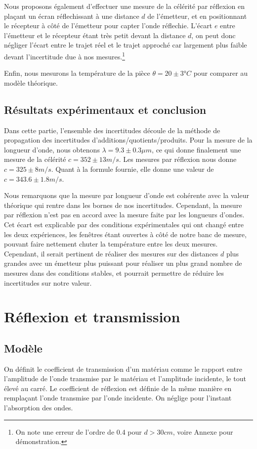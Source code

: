 \documentclass[12pt]{article}
\begin{document}
Nous proposons également d'effectuer une mesure de la célérité par réflexion en plaçant un écran réflechissant à une distance $d$ de l'émetteur, et en positionnant le récepteur à côté de l'émetteur pour capter l'onde réflechie.
L'écart $e$ entre l'émetteur et le récepteur étant très petit devant la distance $d$, on peut donc négliger l'écart entre le trajet réel et le trajet approché car largement plus faible devant l'incertitude due à nos mesures.\footnote{On note une erreur de l'ordre de 0.4 pour $d > 30cm$, voire Annexe pour démonstration.}

Enfin, nous mesurons la température de la pièce $\theta = 20 \pm 3 \text{°} C$ pour comparer au modèle théorique.

\subsection{Résultats expérimentaux et conclusion}
Dans cette partie, l'ensemble des incertitudes découle de la méthode de propagation des incertitudes d'additions/quotients/produits.
Pour la mesure de la longueur d'onde, nous obtenons $\lambda = 9.3 \pm 0.3 \mu m$, ce qui donne finalement une mesure de la célérité $c = 352 \pm 13 m/s$. Les mesures par réflexion nous donne $c = 325 \pm 8 m/s$. 
Quant à la formule fournie, elle donne une valeur de $c = 343.6 \pm 1.8 m/s$.

Nous remarquons que la mesure par longueur d'onde est cohérente avec la valeur théorique qui rentre dans les bornes de nos incertitudes. Cependant, la mesure par réflexion
n'est pas en accord avec la mesure faite par les longueurs d'ondes. Cet écart est explicable par des conditions expérimentales qui ont changé entre les deux expériences, les fenêtres étant ouvertes à côté
de notre banc de mesure, pouvant faire nettement chuter la température entre les deux mesures. Cependant, il serait pertinent de réaliser des mesures sur des distances $d$ plus grandes avec un émetteur plus puissant
pour réaliser un plus grand nombre de mesures dans des conditions stables, et pourrait permettre de réduire les incertitudes sur notre valeur.


\section{Réflexion et transmission}
\subsection{Modèle}
On définit le coefficient de transmission d'un matériau comme le rapport entre l'amplitude de l'onde transmise par le matériau et l'amplitude incidente, le tout élevé au carré. Le coefficient de réflexion est définie  de la même manière en remplaçant l'onde transmise par l'onde incidente. On néglige pour l'instant l'absorption des ondes.
\end{document}
